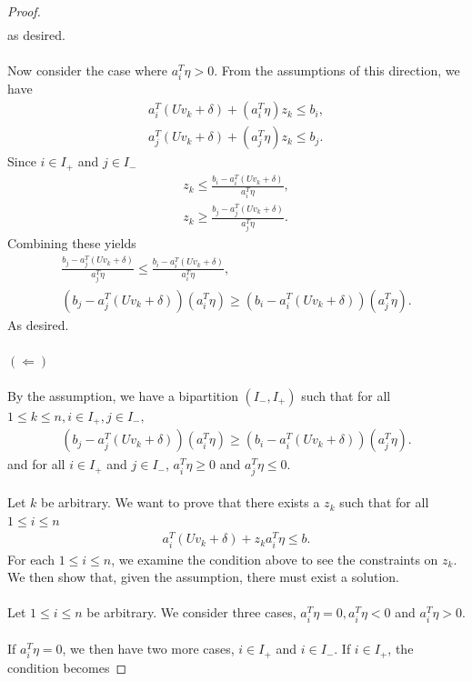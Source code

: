 \documentclass[10pt,a4paper]{amsart}
\begin{document}
\begin{proof}
\begin{gather*}
	\end{gather*}
	as desired.\\\\
	Now consider the case where $a_i^T\eta > 0$. From the assumptions of this direction, we have
	\begin{gather*}
		a_i^T(Uv_k+\delta) + (a_i^T\eta)z_k \leq b_i,\\
		a_j^T(Uv_k+\delta) + (a_j^T\eta)z_k \leq b_j.
	\end{gather*}
	Since $i \in I_+$ and $j \in I_-$
	\begin{gather*}
		z_k \leq \frac{b_i-a_i^T(Uv_k+\delta)}{a_i^T\eta},\\
		z_k \geq \frac{b_j-a_j^T(Uv_k+\delta)}{a_j^T\eta}.
	\end{gather*}
	Combining these yields
	\begin{gather*}
		\frac{b_j-a_j^T(Uv_k+\delta)}{a_j^T\eta} \leq \frac{b_i-a_i^T(Uv_k+\delta)}{a_i^T\eta},\\
		(b_j-a_j^T(Uv_k+\delta))(a_i^T\eta) \geq (b_i-a_i^T(Uv_k+\delta))(a_j^T\eta).
	\end{gather*}
	As desired.\\\\
	$(\Longleftarrow)$
	\\\\
	By the assumption, we have a bipartition $(I_-,I_+)$ such that for all $1 \leq k \leq n, i \in I_+, j \in I_-,$
	\begin{gather*}
		(b_j-a_j^T(Uv_k+\delta))(a_i^T\eta) \geq (b_i-a_i^T(Uv_k+\delta))(a_j^T\eta).
	\end{gather*}
    and for all $i \in I_+$ and $j \in I_-$, $a_i^T\eta \geq 0$ and $a_j^T \eta \leq 0$.\\\\
	Let $k$ be arbitrary. We want to prove that there exists a $z_k$ such that for all $1 \leq i \leq n$
	\begin{gather*}
		a_i^T(Uv_k+\delta)+z_ka_i^T\eta \leq b.
	\end{gather*}
    For each $1 \leq i \leq n$, we examine the condition above to see the constraints on $z_k$. We then show that, given the assumption, there must exist a solution.\\\\
	Let $1 \leq i \leq n$ be arbitrary. We consider three cases, $a_i^T\eta = 0, a_i^T\eta < 0$ and $a_i^T\eta  > 0$.\\\\
	If $a_i^T \eta = 0$, we then have two more cases, $i \in I_+$ and $i \in I_-$. If $i \in I_+$, the condition becomes

\end{proof}
\end{document}
